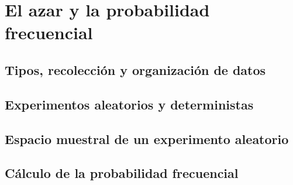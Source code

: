 \documentclass[11pt]{book}
\begin{document}
\section{El azar y la probabilidad frecuencial}
\subsection{Tipos, recolección y organización de datos}
\subsection{Experimentos aleatorios y deterministas}
\subsection{Espacio muestral de un experimento aleatorio}
\subsection{Cálculo de la probabilidad frecuencial}
\end{document}
